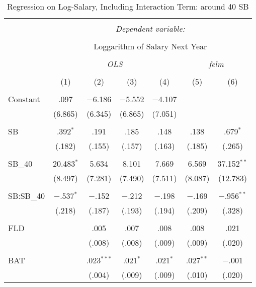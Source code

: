 
\begin{table}[H] \centering
  \caption{Regression on Log-Salary, Including Interaction Term: around 40 SB}
  \label{SB40_A}
\tiny
\begin{tabular}{@{\extracolsep{5pt}}lcccccc}
\\[-1.8ex]\hline
\hline \\[-1.8ex]
 & \multicolumn{6}{c}{\textit{Dependent variable:}} \\
\cline{2-7}
\\[-1.8ex] & \multicolumn{6}{c}{Loggarithm of Salary Next Year} \\
\\[-1.8ex] & \multicolumn{4}{c}{\textit{OLS}} & \multicolumn{2}{c}{\textit{felm}} \\
\\[-1.8ex] & (1) & (2) & (3) & (4) & (5) & (6)\\
\hline \\[-1.8ex]
 Constant & .097 & $-$6.186 & $-$5.552 & $-$4.107 &  &  \\
  & (6.865) & (6.345) & (6.865) & (7.051) &  &  \\
  & & & & & & \\
 SB & .392$^{*}$ & .191 & .185 & .148 & .138 & .679$^{*}$ \\
  & (.182) & (.155) & (.157) & (.163) & (.185) & (.265) \\
  & & & & & & \\
 SB\_40 & 20.483$^{*}$ & 5.634 & 8.101 & 7.669 & 6.569 & 37.152$^{**}$ \\
  & (8.497) & (7.281) & (7.490) & (7.511) & (8.087) & (12.783) \\
  & & & & & & \\
  SB:SB\_40 & $-$.537$^{*}$ & $-$.152 & $-$.212 & $-$.198 & $-$.169 & $-$.956$^{**}$ \\
  & (.218) & (.187) & (.193) & (.194) & (.209) & (.328) \\
  & & & & & & \\
 FLD &  & .005 & .007 & .008 & .008 & .021 \\
  &  & (.008) & (.008) & (.009) & (.009) & (.020) \\
  & & & & & & \\
 BAT &  & .023$^{***}$ & .021$^{*}$ & .021$^{*}$ & .027$^{**}$ & $-$.001 \\
  &  & (.004) & (.009) & (.009) & (.010) & (.020) \\

\end{tabular}
\end{table}
